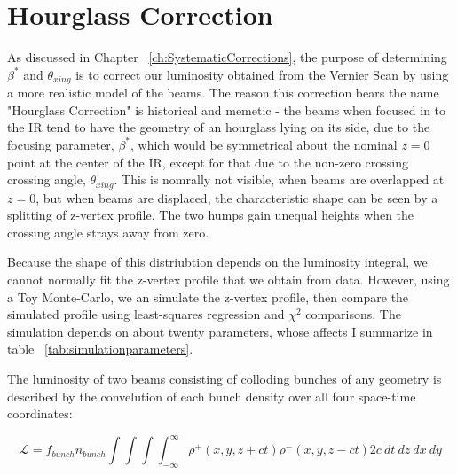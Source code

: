 

\chapter{Hourglass Correction}
\label{ch:HourglassCorrection}

As discussed in Chapter ~\ref{ch:SystematicCorrections}, the purpose of
determining $\beta^{*}$ and $\theta_{xing}$ is to correct our luminosity
obtained from the Vernier Scan by using a more realistic model of the beams.
The reason this correction bears the name "Hourglass Correction" is historical
and memetic - the beams when focused in to the IR tend to have the geometry of
an hourglass lying on its side, due to the focusing parameter, $\beta^{*}$,
which would be symmetrical about the nominal $z = 0$ point at the center of the
IR, except for that due to the non-zero crossing crossing angle,
$\theta_{xing}$. This is nomrally not visible, when beams are overlapped at $z =
0$, but when beams are displaced, the characteristic shape can be seen by a
splitting of z-vertex profile. The two humps gain unequal heights when the
crossing angle strays away from zero.

Because the shape of this distriubtion depends on the luminosity integral, we
cannot normally fit the z-vertex profile that we obtain from data. However,
using a Toy Monte-Carlo, we an simulate the z-vertex profile, then compare the
simulated profile using least-squares regression and $\chi^{2}$ comparisons. The
simulation depends on about twenty parameters, whose affects I summarize in
table ~\ref{tab:simulationparameters}. 

The luminosity of two beams consisting of colloding bunches of any geometry is
described by the convelution of each bunch density over all four space-time
coordinates:

\begin{equation}
\label{eq:generalluminosity}
\mathcal{L} = {f_{bunch}n_{bunch}\int \int \int \int_{-\infty}^{\infty
}\rho^{+}(x,y,z+ct)\rho^{-}(x,y,z-ct)2c\ dt\ dz\ dx\ dy } 
\end{equation}

